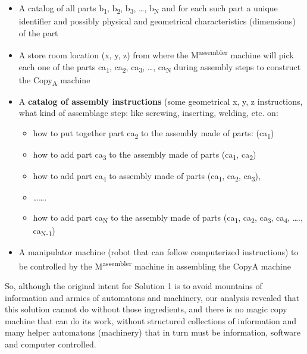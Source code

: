 
\begin{itemize}
\item A catalog of all parts b\textsubscript{1}, b\textsubscript{2},
b\textsubscript{3}, …, b\textsubscript{N  }and for each such part a
unique identifier and possibly physical and geometrical characteristics
(dimensions) of the part
\item A store room location (x, y, z)  from where the
M\textsuperscript{assembler} machine will pick each one of the parts
ca\textsubscript{1}, ca\textsubscript{2}, ca\textsubscript{3}, …,
ca\textsubscript{N }during assembly steps to construct the
Copy\textsubscript{A} machine
\item A \textbf{catalog of assembly instructions} (some geometrical x,
y, z instructions, what kind of assemblage step: like screwing,
inserting, welding, etc. on:

\begin{itemize}
\item how to put together part ca\textsubscript{2} to the assembly made
of parts: (ca\textsubscript{1})
\item how to add part ca\textsubscript{3} to the assembly made of parts
(ca\textsubscript{1}, ca\textsubscript{2})
\item how to add part ca\textsubscript{4} to assembly made of parts
(ca\textsubscript{1}, ca\textsubscript{2}, ca\textsubscript{3}),
\item …….
\item how to add part ca\textsubscript{N} to the assembly made of parts
(ca\textsubscript{1}, ca\textsubscript{2}, ca\textsubscript{3},
ca\textsubscript{4}, …., ca\textsubscript{N-1})
\end{itemize}
\item A manipulator machine (robot that can follow computerized
instructions) to  be controlled by the M\textsuperscript{assembler}
machine in assembling the CopyA machine
\end{itemize}

So, although the original intent for Solution 1 is to avoid mountains of
information and armies of automatons and machinery, our analysis
revealed that this solution cannot do without those ingredients, and
there is no magic copy machine that can do its work, without structured
collections of information and many helper automatons (machinery) that
in turn must be information, software and computer controlled.

